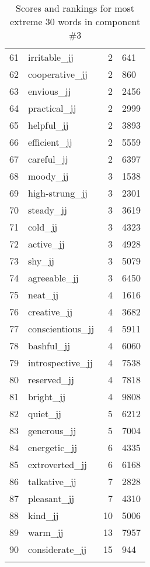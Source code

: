 \begin{longtable}[!htbp]{| rlr@{.}l |}
    61 & irritable\_jj & 2 & 641 \\
    62 & cooperative\_jj & 2 & 860 \\
    63 & envious\_jj & 2 & 2456 \\
    64 & practical\_jj & 2 & 2999 \\
    65 & helpful\_jj & 2 & 3893 \\
    66 & efficient\_jj & 2 & 5559 \\
    67 & careful\_jj & 2 & 6397 \\
    68 & moody\_jj & 3 & 1538 \\
    69 & high-strung\_jj & 3 & 2301 \\
    70 & steady\_jj & 3 & 3619 \\
    71 & cold\_jj & 3 & 4323 \\
    72 & active\_jj & 3 & 4928 \\
    73 & shy\_jj & 3 & 5079 \\
    74 & agreeable\_jj & 3 & 6450 \\
    75 & neat\_jj & 4 & 1616 \\
    76 & creative\_jj & 4 & 3682 \\
    77 & conscientious\_jj & 4 & 5911 \\
    78 & bashful\_jj & 4 & 6060 \\
    79 & introspective\_jj & 4 & 7538 \\
    80 & reserved\_jj & 4 & 7818 \\
    81 & bright\_jj & 4 & 9808 \\
    82 & quiet\_jj & 5 & 6212 \\
    83 & generous\_jj & 5 & 7004 \\
    84 & energetic\_jj & 6 & 4335 \\
    85 & extroverted\_jj & 6 & 6168 \\
    86 & talkative\_jj & 7 & 2828 \\
    87 & pleasant\_jj & 7 & 4310 \\
    88 & kind\_jj & 10 & 5006 \\
    89 & warm\_jj & 13 & 7957 \\
    90 & considerate\_jj & 15 & 944 \\
    \hline
    \caption{Scores and rankings for most extreme 30 words in component \#3} \\
\end{longtable}
